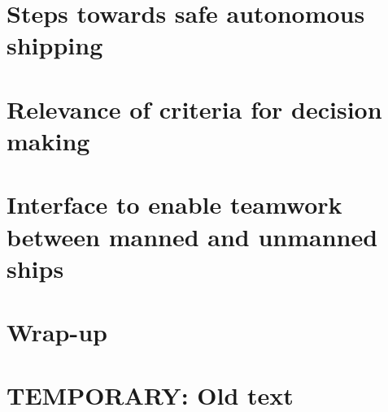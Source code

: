 \documentclass[a4paper,11pt,oneside]{book}
\begin{document}
\frontmatter


\makeCover %

\listoftodos[Notes]
\clearpage





\clearpage
\setcounter{tocdepth}{1}
\tableofcontents
\clearpage

\mainmatter



\part{Steps towards safe autonomous shipping}






\part{Relevance of criteria for decision making}









\part{Interface to enable teamwork between manned and unmanned ships}





\part{Wrap-up}



\backmatter

\part{TEMPORARY: Old text}








\end{document}
